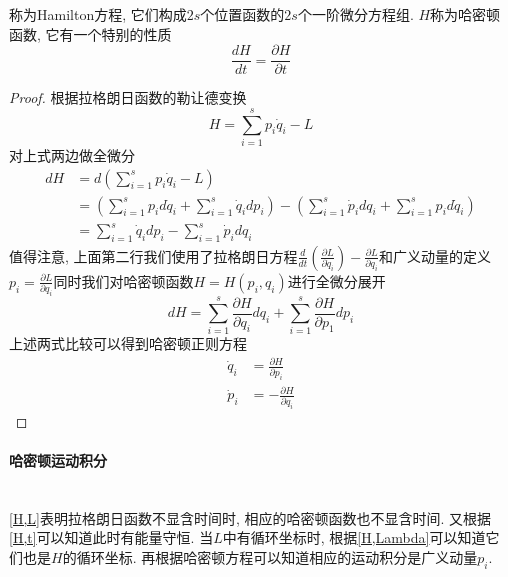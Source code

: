 \documentclass[a4paper,11pt]{article}
\newtheorem{proof}{证明}[section]
\begin{document}
称为Hamilton方程, 它们构成$2s$个位置函数的$2s$个一阶微分方程组. $H$称为哈密顿函数, 它有一个特别的性质
\begin{equation*}
  \frac{dH}{dt}=\frac{\partial H}{\partial t}
\end{equation*}
\begin{proof}
  根据拉格朗日函数的勒让德变换
  \begin{equation*}
    H=\sum_{i=1}^{s}p_i\dot{q}_i-L
  \end{equation*}
  对上式两边做全微分
  \begin{equation*}
    \begin{split}
       dH&=d\left(\sum_{i=1}^{s}p_i\dot{q}_i-L\right) \\
         &=\left(\sum_{i=1}^{s}p_id\dot{q}_i+\sum_{i=1}^{s}\dot{q}_idp_i\right)-\left(\sum_{i=1}^{s}\dot{p}_idq_i+\sum_{i=1}^{s}p_id\dot{q}_i\right)\\
         &=\sum_{i=1}^{s}\dot{q}_idp_i-\sum_{i=1}^{s}\dot{p}_idq_i
    \end{split}
  \end{equation*}
  值得注意, 上面第二行我们使用了拉格朗日方程$\frac{d}{dt}\left(\frac{\partial L}{\partial{\dot{q}_i}}\right)-\frac{\partial L}{\partial{q_i}}$和广义动量的定义$p_i=\frac{\partial L}{\partial{q}_i}$同时我们对哈密顿函数$H=H(p_i,q_i)$进行全微分展开
  \begin{equation*}
    dH=\sum_{i=1}^{s}\frac{\partial H}{\partial{q_i}}dq_i+\sum_{i=1}^{s}\frac{\partial H}{\partial{p_1}}dp_i
  \end{equation*}
  上述两式比较可以得到哈密顿正则方程
  \begin{equation*}
  \begin{split}
     \dot{q}_i&=\frac{\partial H}{\partial{p_i}} \\
     \dot{p}_i&=-\frac{\partial H}{\partial{q_i}}
  \end{split}
  \end{equation*}
\end{proof}
\paragraph*{哈密顿运动积分}\quad\\
\eqref{H,L}表明拉格朗日函数不显含时间时, 相应的哈密顿函数也不显含时间. 又根据\eqref{H,t}可以知道此时有能量守恒. 当$L$中有循环坐标时, 根据\eqref{H,Lambda}可以知道它们也是$H$的循环坐标. 再根据哈密顿方程可以知道相应的运动积分是广义动量$p_i$.
\end{document}

